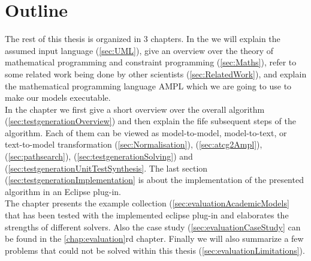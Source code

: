 \section{Outline}
The rest of this thesis is organized in 3 chapters. In the  we will explain the assumed input language (\ref{sec:UML}), give an overview over the theory of mathematical programming and constraint programming (\ref{sec:Maths}), refer to some related work being done by other scientists (\ref{sec:RelatedWork}), and explain the mathematical programming language AMPL which we are going to use to make our models executable.\\
In the chapter  we first give a short overview over the overall algorithm (\ref{sec:testgenerationOverview}) and then explain the fife subsequent steps of the algorithm. Each of them can be viewed as model-to-model, model-to-text, or text-to-model transformation (\ref{sec:Normalisation}), (\ref{sec:atcg2Ampl}), (\ref{sec:pathsearch}), (\ref{sec:testgenerationSolving}) and (\ref{sec:testgenerationUnitTestSynthesis}. The last section (\ref{sec:testgenerationImplementation} is about the implementation of the presented algorithm in an Eclipse plug-in.\\
The chapter  presents the example collection (\ref{sec:evaluationAcademicModels} that has been tested with the implemented eclipse plug-in and elaborates the strengths of different solvers. Also the case study (\ref{sec:evaluationCaseStudy} can be found in the \ref{chap:evaluation}rd chapter. Finally we will also summarize a few problems that could not be solved within this thesis (\ref{sec:evaluationLimitations}).